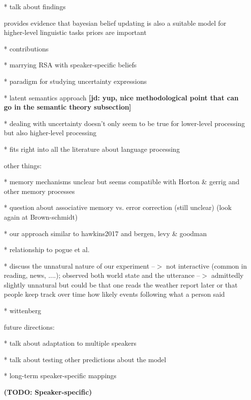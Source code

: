 \documentclass[lucida,biblatex]{sp} %
\newcommand{\jd}[1]{\textcolor{PinkyPurple}{\textbf{[jd: #1]}}}
\newcommand{\todo}[1]{}
\renewcommand{\todo}[1]{{\bf \color{red} (TODO: {#1})}}
\begin{document}
* talk about findings

provides evidence that bayesian belief updating is also a suitable model for higher-level linguistic tasks
priors are important




* contributions
	
	* marrying RSA with speaker-specific beliefs
	
	 * paradigm for studying uncertainty expressions
	
	 * latent semantics approach \jd{yup, nice methodological point that can go in the semantic theory subsection}

 	 * dealing with uncertainty doesn't only seem to be true for lower-level processing but also higher-level processing
	 
	  * fits right into all the literature about language processing
	
	other things:
	
	*  memory mechanisms unclear but seems compatible with Horton \& gerrig and other memory processes
	
	* question about associative memory vs. error correction (still unclear) (look again at Brown-schmidt)
	
 	*  our approach similar to hawkins2017 and bergen, levy \& goodman
	
	*  relationship to pogue et al.
	
	*  discuss the unnatural nature of our experiment --$>$ not interactive (common in reading, news, ....); observed both world state
	     and the utterance --$>$ admittedly slightly unnatural but could be that one reads the weather report later or that people keep track
	     over time how likely events following what a person said
	     
       * wittenberg


future directions:

* talk about adaptation to multiple speakers

* talk about testing other predictions about the model

* long-term speaker-specific mappings
	
\todo{Speaker-specific}


\printbibliography
%



\end{document}
